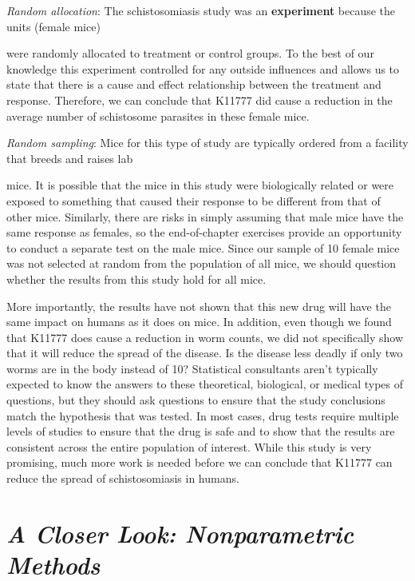 \documentclass[
]{report}
\theoremstyle{definition}
\theoremstyle{definition}
\theoremstyle{definition}
\theoremstyle{definition}
\theoremstyle{remark}
\begin{document}
\emph{Random allocation}: The schistosomiasis study was an \textbf{experiment} because the units (female mice)

were randomly allocated to treatment or control groups. To the best of our knowledge this experiment
controlled for any outside influences and allows us to state that there is a cause and effect relationship
between the treatment and response. Therefore, we can conclude that K11777 did cause a reduction in
the average number of schistosome parasites in these female mice.

\emph{Random sampling}: Mice for this type of study are typically ordered from a facility that breeds and raises lab

mice. It is possible that the mice in this study were biologically related or were exposed to something that
caused their response to be different from that of other mice. Similarly, there are risks in simply assuming
that male mice have the same response as females, so the end-of-chapter exercises provide an opportunity to conduct a separate test on the male mice. Since our sample of 10 female mice was not selected at random
from the population of all mice, we should question whether the results from this study hold for all mice.

More importantly, the results have not shown that this new drug will have the same impact on humans
as it does on mice. In addition, even though we found that K11777 does cause a reduction in worm counts,
we did not specifically show that it will reduce the spread of the disease. Is the disease less deadly if only two
worms are in the body instead of 10? Statistical consultants aren't typically expected to know the answers to
these theoretical, biological, or medical types of questions, but they should ask questions to ensure that the
study conclusions match the hypothesis that was tested. In most cases, drug tests require multiple levels of
studies to ensure that the drug is safe and to show that the results are consistent across the entire population of
interest. While this study is very promising, much more work is needed before we can conclude that K11777
can reduce the spread of schistosomiasis in humans.

\hypertarget{a-closer-look-nonparametric-methods}{%
\section*{\texorpdfstring{\emph{A Closer Look: Nonparametric Methods}}{A Closer Look: Nonparametric Methods}}\label{a-closer-look-nonparametric-methods}}
\end{document}
